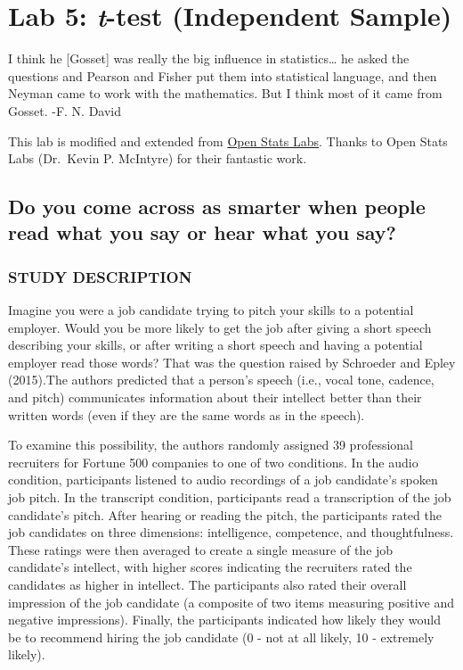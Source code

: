 \documentclass[
]{book}
\begin{document}
\hypertarget{lab-5-t-test-independent-sample}{%
\chapter{\texorpdfstring{Lab 5: \emph{t}-test (Independent Sample)}{Lab 5: t-test (Independent Sample)}}\label{lab-5-t-test-independent-sample}}

{
I think he {[}Gosset{]} was really the big influence in
statistics\ldots{} he asked the questions and Pearson and Fisher put them into statistical language, and then Neyman came to work with the mathematics. But I think
most of it came from Gosset.
-F. N. David
}

This lab is modified and extended from \href{https://sites.trinity.edu/osl}{Open Stats Labs}. Thanks to Open Stats Labs (Dr.~Kevin P. McIntyre) for their fantastic work.

\hypertarget{do-you-come-across-as-smarter-when-people-read-what-you-say-or-hear-what-you-say}{%
\section{Do you come across as smarter when people read what you say or hear what you say?}\label{do-you-come-across-as-smarter-when-people-read-what-you-say-or-hear-what-you-say}}

\hypertarget{study-description-1}{%
\subsection{STUDY DESCRIPTION}\label{study-description-1}}

Imagine you were a job candidate trying to pitch your skills to a potential employer. Would you be more likely to get the job after giving a short speech describing your skills, or after writing a short speech and having a potential employer read those words? That was the question raised by Schroeder and Epley (2015).The authors predicted that a person's speech (i.e., vocal tone, cadence, and pitch) communicates information about their intellect better than their written words (even if they are the same words as in the speech).

To examine this possibility, the authors randomly assigned 39 professional recruiters for Fortune 500 companies to one of two conditions. In the audio condition, participants listened to audio recordings of a job candidate's spoken job pitch. In the transcript condition, participants read a transcription of the job candidate's pitch. After hearing or reading the pitch, the participants rated the job candidates on three dimensions: intelligence, competence, and thoughtfulness. These ratings were then averaged to create a single measure of the job candidate's intellect, with higher scores indicating the recruiters rated the candidates as higher in intellect. The participants also rated their overall impression of the job candidate (a composite of two items measuring positive and negative impressions). Finally, the participants indicated how likely they would be to recommend hiring the job candidate (0 - not at all likely, 10 - extremely likely).
\end{document}
